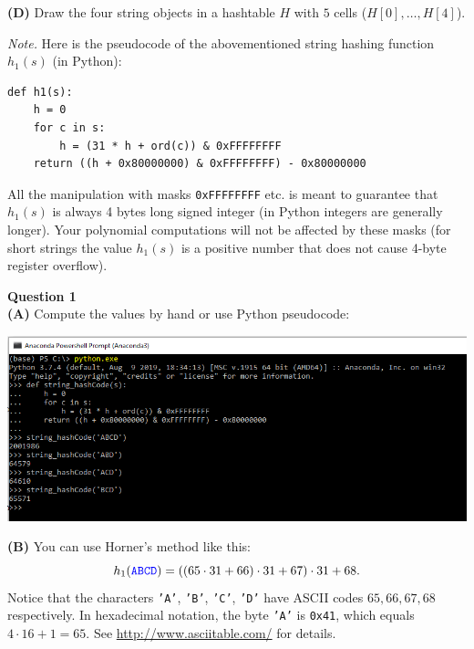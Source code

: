 \documentclass[a4paper,12pt]{article}
\begin{document}
\vspace{10pt}
{\bf (D)} Draw the four string objects in a hashtable $H$ with $5$ cells
($H[0],\ldots,H[4]$). 

\vspace{30pt}
{\em Note.} 
Here is the pseudocode of the abovementioned string hashing function $h_1(s)$ (in Python): 
\begin{verbatim}
def h1(s):
    h = 0
    for c in s:
        h = (31 * h + ord(c)) & 0xFFFFFFFF
    return ((h + 0x80000000) & 0xFFFFFFFF) - 0x80000000
\end{verbatim}

All the manipulation with masks {\tt 0xFFFFFFFF} etc. is meant to guarantee that $h_1(s)$ 
is always 4 bytes long signed integer (in Python integers are generally longer). 
Your polynomial computations will not be affected by these masks (for short strings the
value $h_1(s)$ is a positive number that does not cause 4-byte register overflow). 









\newpage

{\bf Question 1}\\
{\bf (A)} Compute the values by hand or use Python pseudocode:

\includegraphics[width=6in]{assignment07-hashtables/python-console.png}

\vspace{10pt}
{\bf (B)} You can use Horner's method like this: 
$$h_1(\textcolor{blue}{\mathtt{ABCD}}) = ((65 \cdot 31 + 66) \cdot 31 + 67) \cdot 31 + 68.$$ 
Notice that the characters {\tt 'A'}, {\tt 'B'}, {\tt 'C'}, {\tt 'D'} have ASCII codes
$65,66,67,68$ respectively. In hexadecimal notation, the byte {\tt 'A'} is {\tt 0x41}, which 
equals $4 \cdot 16 + 1 = 65$. See \url{http://www.asciitable.com/} for details. 
\end{document}
